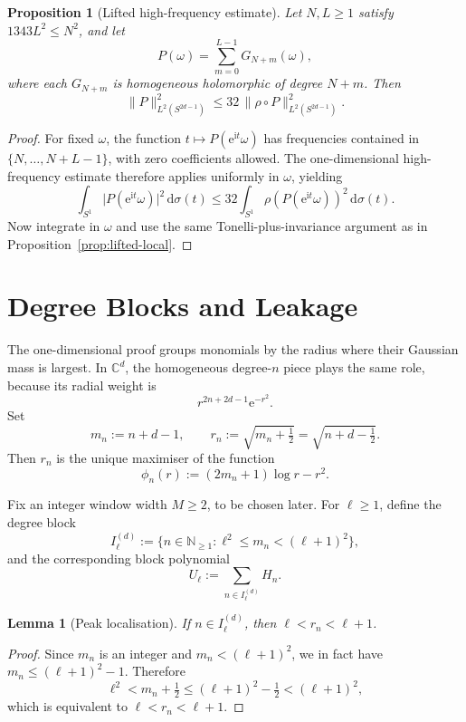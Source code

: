 \documentclass[11pt]{amsart}
\newtheorem{proposition}[theorem]{Proposition}
\newtheorem{lemma}[theorem]{Lemma}
\theoremstyle{remark}
\newcommand{\C}{\mathbb{C}}
\newcommand{\N}{\mathbb{N}}
\newcommand{\abs}[1]{\lvert #1 \rvert}
\newcommand{\norm}[1]{\lVert #1 \rVert}
\newcommand{\dd}{\mathrm{d}}
\newcommand{\ee}{\mathrm{e}}
\newcommand{\ii}{\mathrm{i}}
\newcommand{\rhoFn}{\rho}
\newcommand{\Sphere}{S^{2d-1}}
\begin{document}
\begin{proposition}[Lifted high-frequency estimate]\label{prop:lifted-high}
Let $N,L \ge 1$ satisfy $1343L^2 \le N^2$, and let
\[
P(\omega) = \sum_{m=0}^{L-1} G_{N+m}(\omega),
\]
where each $G_{N+m}$ is homogeneous holomorphic of degree $N+m$.  Then
\[
\norm{P}_{L^2(\Sphere)}^2
\le
32\, \norm{\rhoFn \circ P}_{L^2(\Sphere)}^2.
\]
\end{proposition}

\begin{proof}
For fixed $\omega$, the function
$t \mapsto P(\ee^{\ii t}\omega)$ has frequencies contained in
$\{N,\dots,N+L-1\}$, with zero coefficients allowed.  The one-dimensional
high-frequency estimate therefore applies uniformly in $\omega$, yielding
\[
\int_{S^1} \abs{P(\ee^{\ii t}\omega)}^2\,\dd \sigma(t)
\le
32\int_{S^1} \rhoFn(P(\ee^{\ii t}\omega))^2\,\dd \sigma(t).
\]
Now integrate in $\omega$ and use the same Tonelli-plus-invariance argument
as in Proposition~\ref{prop:lifted-local}.
\end{proof}

\section{Degree Blocks and Leakage}

The one-dimensional proof groups monomials by the radius where their Gaussian
mass is largest.  In $\C^d$, the homogeneous degree-$n$ piece plays the same
role, because its radial weight is
\[
r^{2n+2d-1}\ee^{-r^2}.
\]
Set
\[
m_n := n+d-1,
\qquad
r_n := \sqrt{m_n + \tfrac12} = \sqrt{n+d-\tfrac12}.
\]
Then $r_n$ is the unique maximiser of the function
\[
\phi_n(r)
:=
(2m_n+1)\log r - r^2.
\]

Fix an integer window width $M \ge 2$, to be chosen later.
For $\ell \ge 1$, define the degree block
\[
I_\ell^{(d)}
:=
\bigl\{
n \in \N_{\ge 1} : \ell^2 \le m_n < (\ell+1)^2
\bigr\},
\]
and the corresponding block polynomial
\[
U_\ell := \sum_{n \in I_\ell^{(d)}} H_n.
\]

\begin{lemma}[Peak localisation]\label{lem:peak}
If $n \in I_\ell^{(d)}$, then $\ell < r_n < \ell+1$.
\end{lemma}

\begin{proof}
Since $m_n$ is an integer and $m_n < (\ell+1)^2$, we in fact have
$m_n \le (\ell+1)^2 - 1$.  Therefore
\[
\ell^2
<
m_n + \tfrac12
\le
(\ell+1)^2 - \tfrac12
<
(\ell+1)^2,
\]
which is equivalent to $\ell < r_n < \ell+1$.
\end{proof}
\end{document}
